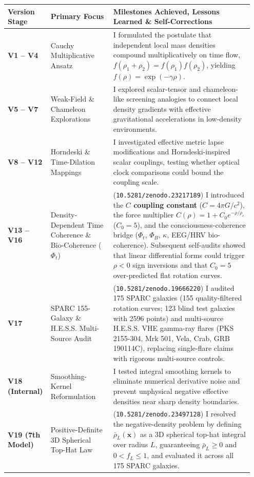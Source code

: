 \documentclass[10pt,a4paper]{article}
\begin{document}
\begin{center}\vspace{-2pt}
{\footnotesize
\begin{tabular}{@{}>{\bfseries\color{navy}}p{0.14\linewidth}p{0.25\linewidth}p{0.56\linewidth}@{}}
\toprule
Version Stage & Primary Focus & Milestones Achieved, Lessons Learned \& Self-Corrections \\
\midrule
V1 -- V4 & Cauchy Multiplicative Ansatz & I formulated the postulate that independent local mass densities compound multiplicatively on time flow, $f(\rho_1+\rho_2)=f(\rho_1)f(\rho_2)$, yielding $f(\rho)=\exp(-\gamma\rho)$. \\
V5 -- V7 & Weak-Field \& Chameleon Explorations & I explored scalar-tensor and chameleon-like screening analogies to connect local density gradients with effective gravitational accelerations in low-density environments. \\
V8 -- V12 & Horndeski \& Time-Dilation Mappings & I investigated effective metric lapse modifications and Horndeski-inspired scalar couplings, testing whether optical clock comparisons could bound the coupling scale. \\
V13 -- V16 & Density-Dependent Time Coherence \& Bio-Coherence ($\Phi_t$) & (\texttt{10.5281/zenodo.23217189}) I introduced the \textbf{$C$ coupling constant} ($C=4\pi G/c^2$), the force multiplier $C(\rho)=1+C_0 e^{-\rho/\rho_c}$ ($C_0=5$), and the consciousness-coherence bridge ($\Phi_t$, $\Phi_B$, $\kappa$, EEG/HRV bio-coherence). Subsequent self-audits showed that linear differential forms could trigger $\rho<0$ sign inversions and that $C_0=5$ over-predicted flat rotation curves. \\
V17 & SPARC 155-Galaxy \& H.E.S.S. Multi-Source Audit & (\texttt{10.5281/zenodo.19666220}) I audited 175 SPARC galaxies (155 quality-filtered rotation curves; 123 blind test galaxies with 2596 points) and multi-source H.E.S.S. VHE gamma-ray flares (PKS 2155-304, Mrk 501, Vela, Crab, GRB 190114C), replacing single-flare claims with rigorous multi-source controls. \\
V18 (Internal) & Smoothing-Kernel Reformulation & I tested integral smoothing kernels to eliminate numerical derivative noise and prevent unphysical negative effective densities near sharp density boundaries. \\
V19 (7th Model) & Positive-Definite 3D Spherical Top-Hat Law & (\texttt{10.5281/zenodo.23497128}) I resolved the negative-density problem by defining $\bar{\rho}_L(\mathbf{x})$ as a 3D spherical top-hat integral over radius $L$, guaranteeing $\bar{\rho}_L\ge 0$ and $0<f_L\le 1$, and evaluated it across all 175 SPARC galaxies. \\

\end{tabular}}
\end{center}
\end{document}
